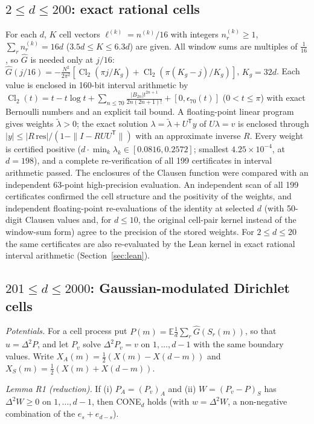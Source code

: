 \documentclass[11pt]{amsart}
\theoremstyle{definition}
\theoremstyle{remark}
\numberwithin{equation}{section}
\newcommand{\Cl}{\operatorname{Cl}_2}
\begin{document}
\subsection{\texorpdfstring{$2\le d\le200$}{2 <= d <= 200}: exact rational cells}
For each $d$, $K$ cell vectors $\ell^{(k)}=n^{(k)}/16$ with integers $n^{(k)}_r\ge1$, $\sum_rn^{(k)}_r=16d$
($3.5d\le K\le6.3d$) are given. All window sums are multiples of $\frac1{16}$, so $\hat G$ is needed only at
$j/16$: $\hat G(j/16)=-\frac{N^2}{2\pi^2}[\Cl(\pi j/K_g)+\Cl(\pi(K_g-j)/K_g)]$, $K_g=32d$. Each value is enclosed in
160-bit interval arithmetic by $\Cl(t)=t-t\log t+\sum_{n\le70}\frac{|B_{2n}|t^{2n+1}}{2n(2n+1)!}+[0,\epsilon_{70}(t)]$
($0<t\le\pi$) with exact Bernoulli numbers and an explicit tail bound. A floating-point linear program gives weights
$\tilde\lambda>0$; the exact solution $\lambda=\tilde\lambda+U^{\mathsf T}y$ of $U\lambda=v$ is enclosed through
$|y|\le|R\,\mathrm{res}|/(1-\|I-RUU^{\mathsf T}\|)$ with an approximate inverse $R$. Every weight is certified positive
($d\cdot\min_k\lambda_k\in[0.0816,0.2572]$; smallest $4.25\times10^{-4}$, at $d=198$), and a complete re-verification of
all 199 certificates in interval arithmetic passed. The enclosures of the Clausen function were compared with an
independent 63-point high-precision evaluation. An independent scan of all 199 certificates confirmed the cell
structure and the positivity of the weights, and independent floating-point re-evaluations of the identity at selected
$d$ (with 50-digit Clausen values and, for $d\le10$, the original cell-pair kernel instead of the window-sum form) agree
to the precision of the stored weights. For $2\le d\le20$ the same certificates are also re-evaluated by the Lean
kernel in exact rational interval arithmetic (Section~\ref{sec:lean}).

\subsection{\texorpdfstring{$201\le d\le2000$}{201 <= d <= 2000}: Gaussian-modulated Dirichlet cells}
\emph{Potentials.} For a cell process put $P(m)=\mathbb{E}\frac1d\sum_r\hat G(S_r(m))$, so that $u=\Delta^2P$, and let
$P_v$ solve $\Delta^2P_v=v$ on $1,\dots,d-1$ with the same boundary values. Write $X_A(m)=\frac12(X(m)-X(d-m))$ and
$X_S(m)=\frac12(X(m)+X(d-m))$.

\emph{Lemma R1 (reduction).} If (i) $P_A=(P_v)_A$ and (ii) $W=(P_v-P)_S$ has $\Delta^2W\ge0$ on $1,\dots,d-1$, then
CONE$_d$ holds (with $w=\Delta^2W$, a non-negative combination of the $e_s+e_{d-s}$).
\end{document}
